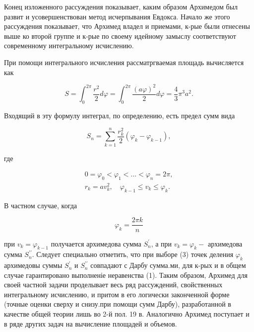 \documentclass[10pt]{article}
\begin{document}
Конец изложенного рассуждения показывает, каким образом Архимедом был развит и усовершенствован метод исчерпывания Евдокса. Начало же этого рассуждения показывает, что Архимед владел и приемами, к-рые были отнесены выше ко второй группе и к-рые по своему идейному замыслу соответствуют современному интегральному исчислению.



При помощи интегрального исчисления рассматргваемая площадь вычисляется как



\[

S=\int_{0}^{2 \pi} \frac{r^{2}}{2} d \varphi=\int_{0}^{2 \pi} \frac{(a \varphi)^{2}}{2} d \varphi=\frac{4}{3} \pi^{3} a^{2} .

\]



Входящий в эту формулу интеграл, по определению, есть предел сумм вида



\[

S_{n}=\sum_{k=1}^{n} \frac{r_{k}^{2}}{2}\left(\varphi_{k}-\varphi_{k-1}\right),

\]



где



\[

\begin{gathered}

0=\varphi_{0}<\varphi_{1}<\ldots<\varphi_{n}=2 \pi, \\

r_{k}=a v_{k}^{2}, \quad \varphi_{k-1} \leqslant v_{k} \leqslant \varphi_{k} .

\end{gathered}

\]



В частном случае, когда



\[

\varphi_{k}=\frac{2 \pi k}{n}

\]



при $v_{k}=\varphi_{k-1}$ получается архимедова сумма $S_{n}^{\prime}$, а при $v_{k}=\varphi_{k}-$ архимедова сумма $S_{n}^{\prime \prime}$. Следует специально отметить, что при выборе (3) точек деления $\varphi_{k}$ архимедовы суммы $S_{n}^{\prime}$ и $S_{n}^{\prime \prime}$ совпадают с Дарбу сумма.ми, для к-рых и в общем случае гарантировано выполненіе неравенства (1). Таким образом, Архимед для своей частной задачи проделывает весь ряд рассуждений, свойственных интегральному исчислению, и притом в его логически законченной форме (точные оценки сверху и снизу.при помощи сумм Дарбу), разработанной в качестве общей теории лишь во 2-й пол. 19 в. Аналогично Архимед поступает и в ряде других задач на вычисление площадей и объемов.
\end{document}
